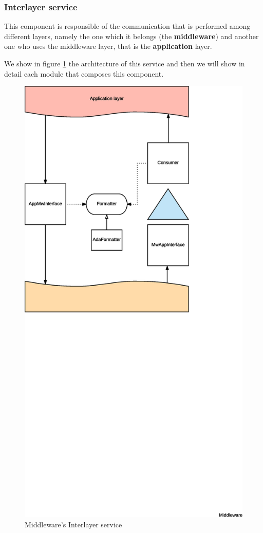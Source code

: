 \subsubsection{Interlayer service}

This component is responsible of the communication that is performed among
different layers, namely the one which it belongs (the \textbf{middleware}) and
another one who uses the middleware layer, that is the \textbf{application}
layer.

We show in figure \ref{fig:mw-interlayer} the architecture of this service and
then we will show in detail each module that composes this component.

\begin{figure}[H]
  \centering
  \includegraphics[width=.8\columnwidth, trim={0 20cm 0 0}]{images/solution/mw/int/architect.eps}
  \caption{Middleware's Interlayer service}
  \label{fig:mw-interlayer}
\end{figure}

